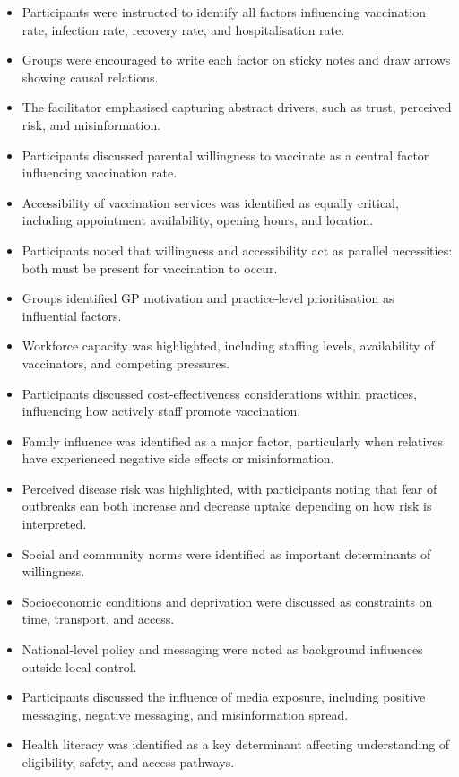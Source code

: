 \documentclass{article}
\begin{document}
\begin{itemize}
    \item Participants were instructed to identify all factors influencing vaccination rate, infection rate, recovery rate, and hospitalisation rate.
    \item Groups were encouraged to write each factor on sticky notes and draw arrows showing causal relations.
    \item The facilitator emphasised capturing abstract drivers, such as trust, perceived risk, and misinformation.
    \item Participants discussed parental willingness to vaccinate as a central factor influencing vaccination rate.
    \item Accessibility of vaccination services was identified as equally critical, including appointment availability, opening hours, and location.
    \item  Participants noted that willingness and accessibility act as parallel necessities: both must be present for vaccination to occur.
    \item Groups identified GP motivation and practice‑level prioritisation as influential factors.
    \item Workforce capacity was highlighted, including staffing levels, availability of vaccinators, and competing pressures.
    \item Participants discussed cost‑effectiveness considerations within practices, influencing how actively staff promote vaccination.
    \item Family influence was identified as a major factor, particularly when relatives have experienced negative side effects or misinformation.
    \item Perceived disease risk was highlighted, with participants noting that fear of outbreaks can both increase and decrease uptake depending on how risk is interpreted.
    \item Social and community norms were identified as important determinants of willingness.
    \item Socioeconomic conditions and deprivation were discussed as constraints on time, transport, and access.
    \item National‑level policy and messaging were noted as background influences outside local control.
    \item Participants discussed the influence of media exposure, including positive messaging, negative messaging, and misinformation spread.
    \item Health literacy was identified as a key determinant affecting understanding of eligibility, safety, and access pathways.

\end{itemize}
\end{document}
